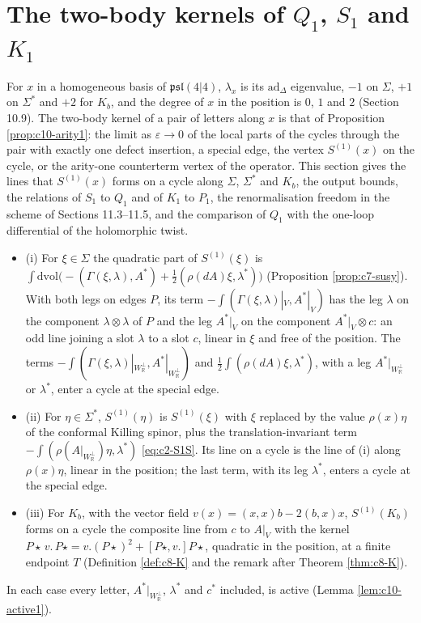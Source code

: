 \section{The two-body kernels of $Q_1$, $S_1$ and $K_1$}

For $x$ in a homogeneous basis of $\mathfrak{psl}(4|4)$, $\lambda_x$ is its $\mathrm{ad}_\Delta$ eigenvalue, $-1$ on $\Sigma$, $+1$ on $\Sigma^*$ and $+2$ for $K_b$, and the degree of $x$ in the position is $0$, $1$ and $2$ (Section 10.9). The two-body kernel of a pair of letters along $x$ is that of Proposition \ref{prop:c10-arity1}: the limit as $\varepsilon\to0$ of the local parts of the cycles through the pair with exactly one defect insertion, a special edge, the vertex $S^{(1)}(x)$ on the cycle, or the arity-one counterterm vertex of the operator. This section gives the lines that $S^{(1)}(x)$ forms on a cycle along $\Sigma$, $\Sigma^*$ and $K_b$, the output bounds, the relations of $S_1$ to $Q_1$ and of $K_1$ to $P_1$, the renormalisation freedom in the scheme of Sections 11.3--11.5, and the comparison of $Q_1$ with the one-loop differential of the holomorphic twist.

\begin{lemma}
\label{lem:c11-lines}
\begin{itemize}
\item (i) For $\xi\in\Sigma$ the quadratic part of $S^{(1)}(\xi)$ is $\int\mathrm{dvol}\big(-(\Gamma(\xi,\lambda),A^*)+\tfrac12(\rho(dA)\xi,\lambda^*)\big)$ (Proposition \ref{prop:c7-susy}). With both legs on edges $P$, its term $-\int(\Gamma(\xi,\lambda)|_V,A^*|_V)$ has the leg $\lambda$ on the component $\lambda\otimes\lambda$ of $P$ and the leg $A^*|_V$ on the component $A^*|_V\otimes c$: an odd line joining a slot $\lambda$ to a slot $c$, linear in $\xi$ and free of the position. The terms $-\int(\Gamma(\xi,\lambda)|_{W_{\mathbb R}^\perp},A^*|_{W_{\mathbb R}^\perp})$ and $\tfrac12\int(\rho(dA)\xi,\lambda^*)$, with a leg $A^*|_{W_{\mathbb R}^\perp}$ or $\lambda^*$, enter a cycle at the special edge.
\item (ii) For $\eta\in\Sigma^*$, $S^{(1)}(\eta)$ is $S^{(1)}(\xi)$ with $\xi$ replaced by the value $\rho(x)\eta$ of the conformal Killing spinor, plus the translation-invariant term $-\int(\rho(A|_{W_{\mathbb R}^\perp})\eta,\lambda^*)$ \eqref{eq:c2-S1S}. Its line on a cycle is the line of (i) along $\rho(x)\eta$, linear in the position; the last term, with its leg $\lambda^*$, enters a cycle at the special edge.
\item (iii) For $K_b$, with the vector field $v(x)=(x,x)b-2(b,x)x$, $S^{(1)}(K_b)$ forms on a cycle the composite line from $c$ to $A|_V$ with the kernel $P\star\,v.\,P\star=v.(P\star)^2+[P\star,v.]P\star$, quadratic in the position, at a finite endpoint $T$ (Definition \ref{def:c8-K} and the remark after Theorem \ref{thm:c8-K}).
\end{itemize}
In each case every letter, $A^*|_{W_{\mathbb R}^\perp}$, $\lambda^*$ and $c^*$ included, is active (Lemma \ref{lem:c10-active1}).
\end{lemma}

